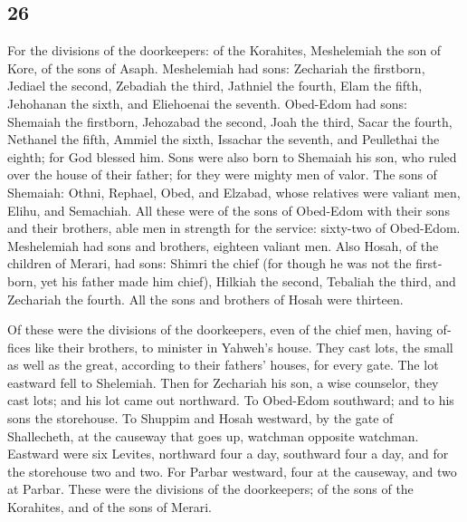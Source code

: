 \begin{paracol}{2}
\switchcolumn
\begin{otherlanguage}{english}

\hypertarget{section-51}{%
\section{26}\label{section-51}}

 For the divisions of the doorkeepers: of the Korahites,
Meshelemiah the son of Kore, of the sons of Asaph. 
Meshelemiah had sons: Zechariah the firstborn, Jediael the second,
Zebadiah the third, Jathniel the fourth,  Elam the fifth,
Jehohanan the sixth, and Eliehoenai the seventh. 
Obed-Edom had sons: Shemaiah the firstborn, Jehozabad the second, Joah
the third, Sacar the fourth, Nethanel the fifth,  Ammiel
the sixth, Issachar the seventh, and Peullethai the eighth; for God
blessed him.  Sons were also born to Shemaiah his son, who
ruled over the house of their father; for they were mighty men of valor.
 The sons of Shemaiah: Othni, Rephael, Obed, and Elzabad,
whose relatives were valiant men, Elihu, and Semachiah. 
All these were of the sons of Obed-Edom with their sons and their
brothers, able men in strength for the service: sixty-two of Obed-Edom.
 Meshelemiah had sons and brothers, eighteen valiant men.
 Also Hosah, of the children of Merari, had sons: Shimri
the chief (for though he was not the firstborn, yet his father made him
chief),  Hilkiah the second, Tebaliah the third, and
Zechariah the fourth. All the sons and brothers of Hosah were thirteen.

 Of these were the divisions of the doorkeepers, even of
the chief men, having offices like their brothers, to minister in
Yahweh's house.  They cast lots, the small as well as the
great, according to their fathers' houses, for every gate.
 The lot eastward fell to Shelemiah. Then for Zechariah
his son, a wise counselor, they cast lots; and his lot came out
northward.  To Obed-Edom southward; and to his sons the
storehouse.  To Shuppim and Hosah westward, by the gate
of Shallecheth, at the causeway that goes up, watchman opposite
watchman.  Eastward were six Levites, northward four a
day, southward four a day, and for the storehouse two and two.
 For Parbar westward, four at the causeway, and two at
Parbar.  These were the divisions of the doorkeepers; of
the sons of the Korahites, and of the sons of Merari.


\end{otherlanguage}
\end{paracol}
